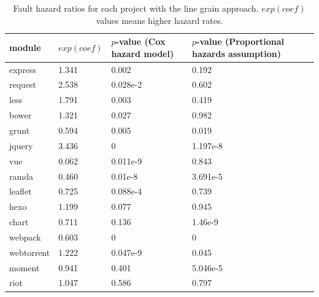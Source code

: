 \begin{table}[t]
	\centering
	\scriptsize
	\caption{Fault hazard ratios for each project with the line grain approach. $exp(coef)$ values means higher hazard rates.}
	\label{hazardlinegrain}
	\begin{tabular}{l|l|l|l}
		\hline
		module & $exp(coef)$ & $p$-value (Cox hazard model) & $p$-value (Proportional hazards assumption)     \\ \hline
		express  & 1.341 & 0.002 & 0.192 \\ \hline
		request  & 2.538 & 0.028e-2 & 0.602 \\ \hline
		less  & 1.791 & 0.003 & 0.419 \\ \hline
		bower	 & 1.321 & 0.027 & 0.982 \\ \hline
		grunt    & 0.594 & 0.005 & 0.019 \\ \hline
		jquery	 & 3.436 & 0 & 1.197e-8 \\ \hline
		vue   & 0.062 & 0.011e-9 & 0.843 \\ \hline
		ramda 	 & 0.460 & 0.01e-8 & 3.691e-5 \\ \hline
		leaflet	 & 0.725 & 0.088e-4 & 0.739 \\ \hline
		hexo	 & 1.199 & 0.077 & 0.945 \\ \hline
		chart	 & 0.711 & 0.136 & 1.46e-9 \\ \hline
		webpack	 & 0.603 & 0 & 0 \\ \hline
		webtorrent & 1.222 & 0.047e-9 & 0.045 \\ \hline
		moment	 & 0.941 & 0.401 & 5.046e-5 \\ \hline
		riot	 & 1.047 & 0.586 & 0.797 \\ \hline
	\end{tabular}

\end{table}


